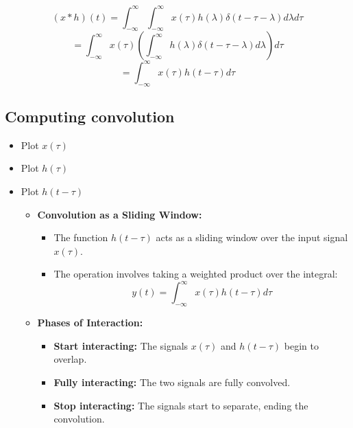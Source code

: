 \begin{derivation}
    \[
    (x * h)(t) = \int_{-\infty}^{\infty} \int_{-\infty}^{\infty} x(\tau) h(\lambda) \delta(t - \tau - \lambda) d\lambda d\tau
    \]
    \[
    = \int_{-\infty}^{\infty} x(\tau) \left( \int_{-\infty}^{\infty} h(\lambda) \delta(t - \tau - \lambda) d\lambda \right) d\tau
    \]
    \[
    = \int_{-\infty}^{\infty} x(\tau) h(t - \tau) d\tau
    \]
      
\end{derivation}

\subsection{Computing convolution}
\begin{intuition}
    \begin{itemize}
        \item Plot $x(\tau)$
        \item Plot $h(\tau)$
        \item Plot $h(t-\tau)$
        \begin{itemize}
            \item \textbf{Convolution as a Sliding Window:}
            \begin{itemize}
                \item The function \( h(t - \tau) \) acts as a sliding window over the input signal \( x(\tau) \).
                \item The operation involves taking a weighted product over the integral:
                \[
                y(t) = \int_{-\infty}^{\infty} x(\tau) h(t - \tau) d\tau
                \]
            \end{itemize}
        
            \item \textbf{Phases of Interaction:}
            \begin{itemize}
                \item \textbf{Start interacting:} The signals \( x(\tau) \) and \( h(t - \tau) \) begin to overlap.
                \item \textbf{Fully interacting:} The two signals are fully convolved.
                \item \textbf{Stop interacting:} The signals start to separate, ending the convolution.
            \end{itemize}
        

\end{itemize}
\end{itemize}
\end{intuition}
